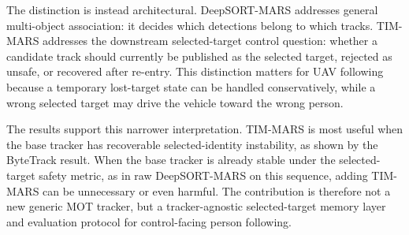 The distinction is instead architectural. DeepSORT-MARS addresses general multi-object association: it decides which detections belong to which tracks. TIM-MARS addresses the downstream selected-target control question: whether a candidate track should currently be published as the selected target, rejected as unsafe, or recovered after re-entry. This distinction matters for UAV following because a temporary lost-target state can be handled conservatively, while a wrong selected target may drive the vehicle toward the wrong person.

The results support this narrower interpretation. TIM-MARS is most useful when the base tracker has recoverable selected-identity instability, as shown by the ByteTrack result. When the base tracker is already stable under the selected-target safety metric, as in raw DeepSORT-MARS on this sequence, adding TIM-MARS can be unnecessary or even harmful. The contribution is therefore not a new generic MOT tracker, but a tracker-agnostic selected-target memory layer and evaluation protocol for control-facing person following.

